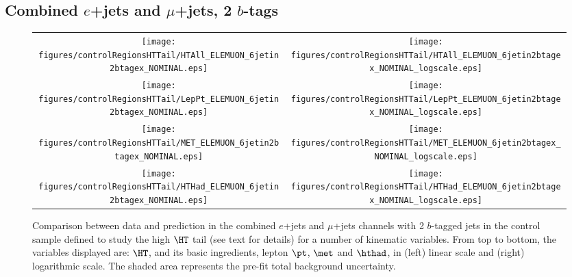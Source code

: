 \clearpage
\subsection{Combined $e$+jets and $\mu$+jets, 2 $b$-tags}
\label{sec:ELEMUON_controlHTTail_2tagex}

\begin{figure}[htbp]
\begin{center}
\begin{tabular}{cc}
%
\texttt{[image: figures/controlRegionsHTTail/HTAll\_ELEMUON\_6jetin2btagex\_NOMINAL.eps]} &
\texttt{[image: figures/controlRegionsHTTail/HTAll\_ELEMUON\_6jetin2btagex\_NOMINAL\_logscale.eps]} \\
\texttt{[image: figures/controlRegionsHTTail/LepPt\_ELEMUON\_6jetin2btagex\_NOMINAL.eps]} &
\texttt{[image: figures/controlRegionsHTTail/LepPt\_ELEMUON\_6jetin2btagex\_NOMINAL\_logscale.eps]} \\
\texttt{[image: figures/controlRegionsHTTail/MET\_ELEMUON\_6jetin2btagex\_NOMINAL.eps]} &
\texttt{[image: figures/controlRegionsHTTail/MET\_ELEMUON\_6jetin2btagex\_NOMINAL\_logscale.eps]} \\
\texttt{[image: figures/controlRegionsHTTail/HTHad\_ELEMUON\_6jetin2btagex\_NOMINAL.eps]} &
\texttt{[image: figures/controlRegionsHTTail/HTHad\_ELEMUON\_6jetin2btagex\_NOMINAL\_logscale.eps]} \\

\end{tabular}\caption{\small {Comparison between data and prediction in the combined $e$+jets and $\mu$+jets channels with 2 $b$-tagged jets in the control sample
defined to study the high $\HT$ tail (see text for details)  for a number of kinematic
variables. From top to bottom, the variables displayed are: $\HT$, and its basic ingredients, lepton $\pt$, $\met$ and $\hthad$,
in (left) linear scale and (right) logarithmic scale.
The shaded area represents the pre-fit total background uncertainty.}}
\label{fig:ELEMUON_controlHTTail_2btagex_1}
\end{center}
\end{figure}
